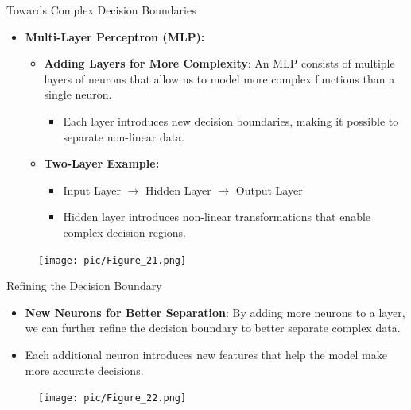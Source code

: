 \documentclass[serif, aspectratio=169]{beamer}
\begin{document}
\begin{frame}{Towards Complex Decision Boundaries}
    \begin{itemize}
        \item \textbf{Multi-Layer Perceptron (MLP):}
        \medskip
        \begin{itemize}\itemsep1em
            \item \justifying \textbf{Adding Layers for More Complexity}:
            An MLP consists of multiple layers of neurons that allow us to model more complex functions than a single neuron.
            \begin{itemize}
                \item \justifying Each layer introduces new decision boundaries, making it possible to separate non-linear data.
            \end{itemize}
            \item \justifying \textbf{Two-Layer Example:}
            \begin{itemize}
                \item Input Layer $\rightarrow$ Hidden Layer $\rightarrow$ Output Layer
                \item Hidden layer introduces non-linear transformations that enable complex decision regions.
            \end{itemize}
        \end{itemize}
    \end{itemize}
    \begin{figure}
        \centering
        \texttt{[image: pic/Figure\_21.png]}
    \end{figure}
\end{frame}


\begin{frame}{Refining the Decision Boundary}
    \begin{itemize}
        \item \justifying \textbf{New Neurons for Better Separation}:
        By adding more neurons to a layer, we can further refine the decision boundary to better separate complex data.
        \item \justifying Each additional neuron introduces new features that help the model make more accurate decisions.
    \end{itemize}
    \begin{figure}
        \centering
        \texttt{[image: pic/Figure\_22.png]}
    \end{figure}
\end{frame}
\end{document}
